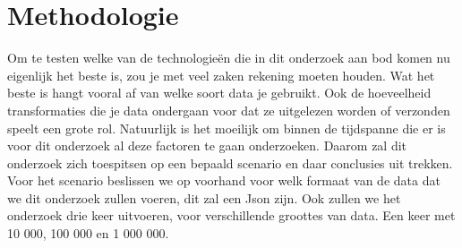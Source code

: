 
\chapter{Methodologie}
\label{ch:methodologie}




Om te testen welke van de technologieën die in dit onderzoek aan bod komen nu eigenlijk het beste is, zou je met veel zaken rekening moeten houden. Wat het beste is hangt vooral af van welke soort data je gebruikt. Ook de hoeveelheid transformaties die je data ondergaan voor dat ze uitgelezen worden of verzonden speelt een grote rol. Natuurlijk is het moeilijk om binnen de tijdspanne die er is voor dit onderzoek al deze factoren te gaan onderzoeken. Daarom zal dit onderzoek zich toespitsen op een bepaald scenario en daar conclusies uit trekken. Voor het scenario beslissen we op voorhand voor welk formaat van de data dat we dit onderzoek zullen voeren, dit zal een Json zijn. Ook zullen we het onderzoek drie keer uitvoeren, voor verschillende groottes van data. Een keer met 10 000, 100 000 en 1 000 000.  

